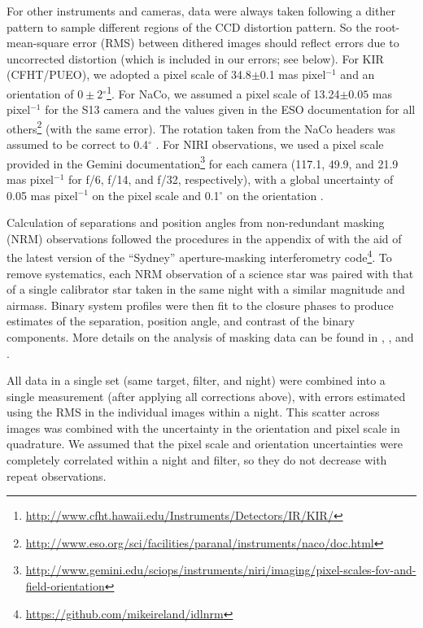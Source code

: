 \documentclass[twocolumn]{aastex62}
\newcommand{\degree}{$^{\circ}$}
\begin{document}
For other instruments and cameras, data were always taken following a dither pattern to sample different regions of the CCD distortion pattern. So the root-mean-square error (RMS) between dithered images should reflect errors due to uncorrected distortion (which is included in our errors; see below). For KIR (CFHT/PUEO), we adopted a pixel scale of 34.8$\pm$0.1 mas pixel$^{-1}$ \citep{2003ApJ...589..410S} and an orientation of $0\pm2$\degree \footnote{\href{http://www.cfht.hawaii.edu/Instruments/Detectors/IR/KIR/}{http://www.cfht.hawaii.edu/Instruments/Detectors/IR/KIR/}}. For NaCo, we assumed a pixel scale of 13.24$\pm0.05$ mas pixel$^{-1}$ for the S13 camera \citep{2003A&A...411..157M,2005A&A...435L..13N} and the values given in the ESO documentation for all others\footnote{\href{http://www.eso.org/sci/facilities/paranal/instruments/naco/doc.html}{http://www.eso.org/sci/facilities/paranal/instruments/naco/doc.html}} (with the same error). The rotation taken from the NaCo headers was assumed to be correct to 0.4$^{\circ}$ \citep{Sef2008}. For NIRI observations, we used a pixel scale provided in the Gemini documentation\footnote{\href{http://www.gemini.edu/sciops/instruments/niri/imaging/pixel-scales-fov-and-field-orientation}{http://www.gemini.edu/sciops/instruments/niri/imaging/pixel-scales-fov-and-field-orientation}} for each camera (117.1, 49.9, and 21.9 mas pixel$^{-1}$ for f/6, f/14, and f/32, respectively), with a global uncertainty of 0.05 mas pixel$^{-1}$ on the pixel scale and 0.1$^{\circ}$ on the orientation \citep{2004ApJ...614..235B}. 

Calculation of separations and position angles from non-redundant masking (NRM) observations followed the procedures in the appendix of \citet{Kraus2008} with the aid of the latest version of the ``Sydney'' aperture-masking interferometry code\footnote{\href{https://github.com/mikeireland/idlnrm}{https://github.com/mikeireland/idlnrm}}. To remove systematics, each NRM observation of a science star was paired with that of a single calibrator star taken in the same night with a similar magnitude and airmass. Binary system profiles were then fit to the closure phases to produce estimates of the separation, position angle, and contrast of the binary components. More details on the analysis of masking data can be found in \citet{2006ApJ...650L.131L}, \citet{Kraus2008}, and \citet{2012ApJ...744..120E}.

All data in a single set (same target, filter, and night) were combined into a single measurement (after applying all corrections above), with errors estimated using the RMS in the individual images within a night. This scatter across images was combined with the uncertainty in the orientation and pixel scale in quadrature. We assumed that the pixel scale and orientation uncertainties were completely correlated within a night and filter, so they do not decrease with repeat observations. 
\end{document}
